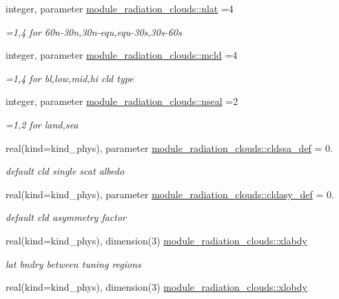 \begin{DoxyCompactItemize}
integer, parameter \hyperlink{group__module__radiation__clouds_gad4274cb223949e858ecc2e6346bed610}{module\+\_\+radiation\+\_\+clouds\+::nlat} =4
\begin{DoxyCompactList}\small\item\em =1,4 for 60n-\/30n,30n-\/equ,equ-\/30s,30s-\/60s \end{DoxyCompactList}\item 
integer, parameter \hyperlink{group__module__radiation__clouds_gafb94f3d62afa49bef6c33f73a7ecad65}{module\+\_\+radiation\+\_\+clouds\+::mcld} =4
\begin{DoxyCompactList}\small\item\em =1,4 for bl,low,mid,hi cld type \end{DoxyCompactList}\item 
integer, parameter \hyperlink{group__module__radiation__clouds_gaaf2a6549a8c42b9eae3d40d21d1e9532}{module\+\_\+radiation\+\_\+clouds\+::nseal} =2
\begin{DoxyCompactList}\small\item\em =1,2 for land,sea \end{DoxyCompactList}\item 
real(kind=kind\+\_\+phys), parameter \hyperlink{group__module__radiation__clouds_ga2ce850be46f0144caa09309ae01958c2}{module\+\_\+radiation\+\_\+clouds\+::cldssa\+\_\+def} = 0.
\begin{DoxyCompactList}\small\item\em default cld single scat albedo \end{DoxyCompactList}\item 
real(kind=kind\+\_\+phys), parameter \hyperlink{group__module__radiation__clouds_gab94e45a81d8be82b6cb686b35fd78a80}{module\+\_\+radiation\+\_\+clouds\+::cldasy\+\_\+def} = 0.
\begin{DoxyCompactList}\small\item\em default cld asymmetry factor \end{DoxyCompactList}\item 
real(kind=kind\+\_\+phys), dimension(3) \hyperlink{group__module__radiation__clouds_gab2a798da0bb0125d1d5074b73c5951dc}{module\+\_\+radiation\+\_\+clouds\+::xlabdy}
\begin{DoxyCompactList}\small\item\em lat bndry between tuning regions \end{DoxyCompactList}\item 
real(kind=kind\+\_\+phys), dimension(3) \hyperlink{group__module__radiation__clouds_gaab28f783919380e5ff7f925f70355a57}{module\+\_\+radiation\+\_\+clouds\+::xlobdy}

\end{DoxyCompactItemize}
